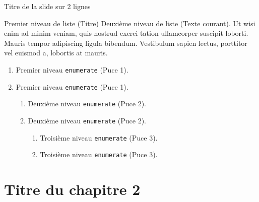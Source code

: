 \documentclass[A4,svgnames,9pt,aspectratio=169]{beamer}
\begin{document}
\begin{frame}{Titre de la slide \newline sur 2 lignes}
    \begin{block}{Premier niveau de liste (Titre)}
       Deuxième niveau de liste (Texte courant). Ut wisi enim ad minim veniam, quis nostrud exerci tation
       ullamcorper suscipit loborti. Mauris tempor adipiscing ligula bibendum. Vestibulum sapien lectus,
       porttitor vel euismod a, lobortis at mauris.
      \begin{enumerate}
         \item Premier niveau \texttt{enumerate} (Puce 1). 
         \item Premier niveau \texttt{enumerate} (Puce 1). 
         \begin{enumerate}
            \item Deuxième niveau \texttt{enumerate} (Puce 2).
            \item Deuxième niveau \texttt{enumerate} (Puce 2).
            \begin{enumerate}
               \item Troisième niveau \texttt{enumerate} (Puce 3).
               \item Troisième niveau \texttt{enumerate} (Puce 3).
            \end{enumerate}
          \end{enumerate}
        \end{enumerate}
   \end{block}
\end{frame}


\section{Titre du chapitre 2}
\frame{\sectionpage}

\end{document}
